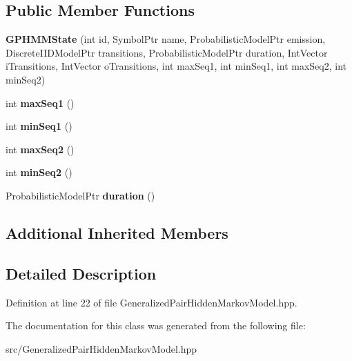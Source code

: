 \subsection*{Public Member Functions}
\begin{DoxyCompactItemize}
\item 
\mbox{\label{classtops_1_1GPHMMState_a59b8730fbfe7e1b38f4183374d45552b}} 
{\bfseries G\+P\+H\+M\+M\+State} (int id, Symbol\+Ptr name, Probabilistic\+Model\+Ptr emission, Discrete\+I\+I\+D\+Model\+Ptr transitions, Probabilistic\+Model\+Ptr duration, Int\+Vector i\+Transitions, Int\+Vector o\+Transitions, int max\+Seq1, int min\+Seq1, int max\+Seq2, int min\+Seq2)
\item 
\mbox{\label{classtops_1_1GPHMMState_a80f80ccfaf58e48f1047c4cab55b7d64}} 
int {\bfseries max\+Seq1} ()
\item 
\mbox{\label{classtops_1_1GPHMMState_a7b93516f9ac6604c2e03a6d59dfa0bb2}} 
int {\bfseries min\+Seq1} ()
\item 
\mbox{\label{classtops_1_1GPHMMState_a43491b35a646c975207c23d243f507f3}} 
int {\bfseries max\+Seq2} ()
\item 
\mbox{\label{classtops_1_1GPHMMState_a2e9ef8d39a98a4dc297bfaf986f20f8a}} 
int {\bfseries min\+Seq2} ()
\item 
\mbox{\label{classtops_1_1GPHMMState_ad9f417057211aad8ffb00274d342a8ae}} 
Probabilistic\+Model\+Ptr {\bfseries duration} ()
\end{DoxyCompactItemize}
\subsection*{Additional Inherited Members}


\subsection{Detailed Description}


Definition at line 22 of file Generalized\+Pair\+Hidden\+Markov\+Model.\+hpp.



The documentation for this class was generated from the following file\+:\begin{DoxyCompactItemize}
\item 
src/Generalized\+Pair\+Hidden\+Markov\+Model.\+hpp\end{DoxyCompactItemize}
